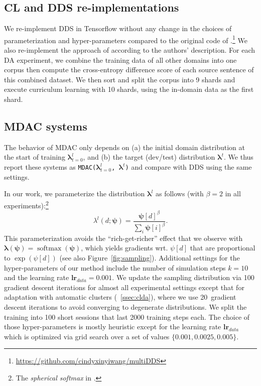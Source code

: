\documentclass[11pt]{article}
\newcommand{\fyDone}[1]{\done[FY]\Todo[FY:]{\textcolor{orange}{#1}}}
\newcommand{\fyFuture}[1]{\done[FY]\Todo[FY:]{\textcolor{red}{#1}}}
\newcommand{\system}[1]{\texttt{{#1}}}
\newcommand{\vlambda}{\ensuremath{\boldsymbol\lambda}\xspace} %
\newcommand{\vpsi}{\ensuremath{\boldsymbol\psi}\xspace} %
\begin{document}
\subsection{CL and DDS re-implementations}\fyDone{Right place for this ?}
We re-implement DDS in Tensorflow without any change in the choices of parameterization and hyper-parameters compared to the original code of .\footnote{\url{https://github.com/cindyxinyiwang/multiDDS}}
% 
We also re-implement the approach of  according to the authors' description. For each DA experiment, we combine the training data of all other domains into one corpus then compute the cross-entropy difference score of each source sentence of this combined dataset. We then sort and split the corpus into 9 shards and execute curriculum learning with 10 shards, using the in-domain data as the first shard.

\subsection{MDAC systems} \label{ssec:dds-sys}
The behavior of MDAC only depends on (a) the initial domain distribution at the start of training $\vlambda^{l}_{t=0}$, and (b) the target (dev/test) distribution $\vlambda^{t}$. We thus report these systems as \system{MDAC($\vlambda^{l}_{t=0}$, $\vlambda^{t}$)} and compare with DDS using the same settings.

In our work, we parameterize the distribution $\vlambda^l$ as follows (with $\beta=2$ in all experiments):\footnote{The \emph{spherical softmax} in \cite{Brebisson16anexploration}.}\fyDone{Explain why}
\begin{equation}
\lambda^l(d;\vpsi) = \frac{\vpsi[d]^\beta}{\sum_i \vpsi[i]^\beta}. \nonumber
\end{equation}
This parameterization avoids the ``rich-get-richer'' effect that we observe with $\vlambda(\vpsi) = \operatorname{softmax}(\vpsi)$, which yields gradients wrt. $\psi[d]$ that are proportional to $\exp(\psi[d])$ (see also Figure~\ref{fig:sampling}). Additional settings for the hyper-parameters of our method include the number of simulation steps $k=10$ and the learning rate $\mathbf{lr}_{data}=0.001$. We update the sampling distribution via 100 gradient descent iterations for almost all experimental settings except that for adaptation with automatic clusters (\textsection~\ref{ssec:clda}), where we use 20~gradient descent iterations to avoid converging to degenerate distributions.\fyFuture{Why? computation?} We split the training into 100 short sessions that last 2000 training steps each. The choice of those hyper-parameters is mostly heuristic except for the learning rate $\mathbf{lr}_{data}$ which is optimized via grid search over a set of values $\{0.001,0.0025,0.005\}$.
\end{document}
